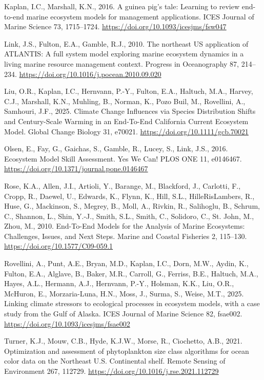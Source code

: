 \documentclass[
]{article}
\newlength{\cslhangindent}
\newenvironment{CSLReferences}[2] %
 {\begin{list}{}{%
  \setlength{\itemindent}{0pt}
  \setlength{\leftmargin}{0pt}
  \setlength{\parsep}{0pt}
  \ifodd #1
   \setlength{\leftmargin}{\cslhangindent}
   \setlength{\itemindent}{-1\cslhangindent}
  \fi
  \setlength{\itemsep}{#2\baselineskip}}}
 {\end{list}}
\begin{document}
\begin{CSLReferences}{1}{0}
Kaplan, I.C., Marshall, K.N., 2016. A guinea pig's tale: Learning to review end-to-end marine ecosystem models for management applications. ICES Journal of Marine Science 73, 1715--1724. \url{https://doi.org/10.1093/icesjms/fsw047}

Link, J.S., Fulton, E.A., Gamble, R.J., 2010. The northeast {US} application of {ATLANTIS}: {A} full system model exploring marine ecosystem dynamics in a living marine resource management context. Progress in Oceanography 87, 214--234. \url{https://doi.org/10.1016/j.pocean.2010.09.020}

Liu, O.R., Kaplan, I.C., Hernvann, P.-Y., Fulton, E.A., Haltuch, M.A., Harvey, C.J., Marshall, K.N., Muhling, B., Norman, K., Pozo Buil, M., Rovellini, A., Samhouri, J.F., 2025. Climate {Change Influences} via {Species Distribution Shifts} and {Century}-{Scale Warming} in an {End}-{To}-{End California Current Ecosystem Model}. Global Change Biology 31, e70021. \url{https://doi.org/10.1111/gcb.70021}

Olsen, E., Fay, G., Gaichas, S., Gamble, R., Lucey, S., Link, J.S., 2016. Ecosystem {Model Skill Assessment}. {Yes We Can}! PLOS ONE 11, e0146467. \url{https://doi.org/10.1371/journal.pone.0146467}

Rose, K.A., Allen, J.I., Artioli, Y., Barange, M., Blackford, J., Carlotti, F., Cropp, R., Daewel, U., Edwards, K., Flynn, K., Hill, S.L., HilleRisLambers, R., Huse, G., Mackinson, S., Megrey, B., Moll, A., Rivkin, R., Salihoglu, B., Schrum, C., Shannon, L., Shin, Y.-J., Smith, S.L., Smith, C., Solidoro, C., St. John, M., Zhou, M., 2010. End-{To-End Models} for the {Analysis} of {Marine Ecosystems}: {Challenges}, {Issues}, and {Next Steps}. Marine and Coastal Fisheries 2, 115--130. \url{https://doi.org/10.1577/C09-059.1}

Rovellini, A., Punt, A.E., Bryan, M.D., Kaplan, I.C., Dorn, M.W., Aydin, K., Fulton, E.A., Alglave, B., Baker, M.R., Carroll, G., Ferriss, B.E., Haltuch, M.A., Hayes, A.L., Hermann, A.J., Hernvann, P.-Y., Holsman, K.K., Liu, O.R., McHuron, E., Morzaria-Luna, H.N., Moss, J., Surma, S., Weise, M.T., 2025. Linking climate stressors to ecological processes in ecosystem models, with a case study from the {Gulf} of {Alaska}. ICES Journal of Marine Science 82, fsae002. \url{https://doi.org/10.1093/icesjms/fsae002}

Turner, K.J., Mouw, C.B., Hyde, K.J.W., Morse, R., Ciochetto, A.B., 2021. Optimization and assessment of phytoplankton size class algorithms for ocean color data on the {Northeast U}.{S}. Continental shelf. Remote Sensing of Environment 267, 112729. \url{https://doi.org/10.1016/j.rse.2021.112729}

\end{CSLReferences}
\end{document}
